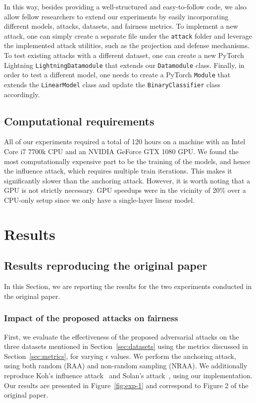 
In this way, besides providing a well-structured and easy-to-follow code, we also allow fellow researchers to extend our experiments by easily incorporating different models, attacks, datasets, and fairness metrics. To implement a new attack, one can simply create a separate file under the \texttt{attack} folder and leverage the implemented attack utilities, such as the projection and defense mechanisms. To test existing attacks with a different dataset, one can create a new PyTorch Lightning \texttt{LightningDatamodule} that extends our \texttt{Datamodule} class.
Finally, in order to test a different model, one needs to create a PyTorch \texttt{Module} that extends the \texttt{LinearModel} class and update the \texttt{BinaryClassifier} class accordingly.

\subsection{Computational requirements}
All of our experiments required a total of 120 hours on a machine with an Intel Core i7 7700k CPU and an NVIDIA GeForce GTX 1080 GPU. We found the most computationally expensive part to be the training of the models, and hence the influence attack, which requires multiple train iterations. This makes it significantly slower than the anchoring attack. However, it is worth noting that a GPU is not strictly necessary. GPU speedups were in the vicinity of 20\% over a CPU-only setup since we only have a single-layer linear model.

\section{Results}
\label{sec:results}

\subsection{Results reproducing the original paper}
\label{sec:results-original}
In this Section, we are reporting the results for the two experiments conducted in the original paper.

\subsubsection{Impact of the proposed attacks on fairness}
\label{sec:exp-1}
First, we evaluate the effectiveness of the proposed adversarial attacks on the three datasets mentioned in Section~\ref{sec:datasets} using the metrics discussed in Section~\ref{sec:metrics}, for varying $\epsilon$ values. We perform the anchoring attack, using both random (RAA) and non-random sampling (NRAA). We additionally reproduce Koh's influence attack~\cite{koh2018} and Solan's attack~\cite{solans2020poisoning}, using our implementation. Our results are presented in Figure~\ref{fig:exp-1} and correspond to Figure 2 of the original paper.

